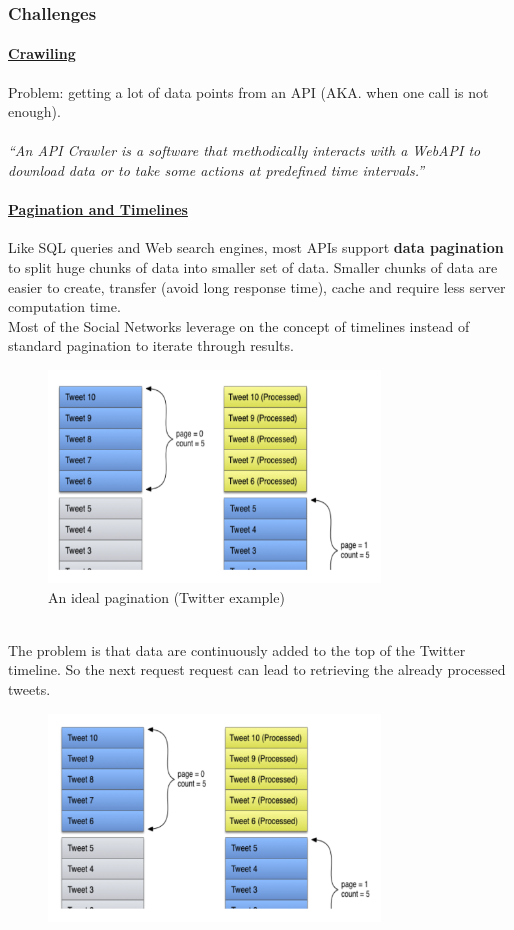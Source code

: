 \documentclass[10pt,a4paper]{article}
\newcommand{\nline}{\\~\\}
\begin{document}
\subsubsection{Challenges}
\paragraph{\uline{Crawiling}} 
Problem: getting a lot of data points from an API (AKA. when one call is not enough). \nline
\textit{“An API Crawler is a software that methodically interacts with a WebAPI to download data or to take some actions at predefined time intervals.”}
\paragraph{\uline{Pagination and Timelines}}
Like SQL queries and Web search engines, most APIs support
\textbf{data pagination} to split huge chunks of data into smaller set of data. Smaller chunks of data are easier to create, transfer (avoid long response time), cache and require less server computation time.  \\
\pagebreak
Most of the Social Networks leverage on the concept of timelines instead of standard pagination to iterate through results.
  \begin{figure}[ht!]
 \hfill \includegraphics[width=250pt]{images/challenges-page1}
 \hspace*{\fill}
 \caption{An ideal pagination (Twitter example)}
 \end{figure} \\
The problem is that data are continuously added to the top of the Twitter timeline. So the next request request can lead to retrieving the already processed tweets.
  \begin{figure}[ht!]
 \hfill \includegraphics[width=250pt]{images/challenges-page2}
 \hspace*{\fill}
 \end{figure} \\
\end{document}
